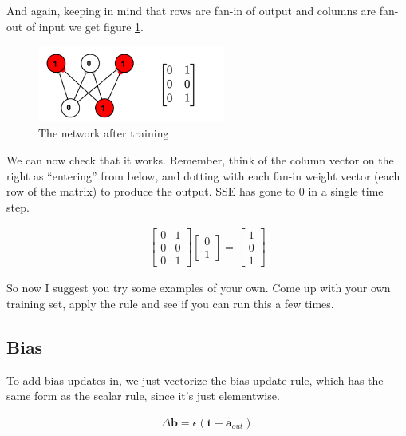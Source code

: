 And again, keeping in mind that rows are fan-in of output and columns are fan-out of input we get figure \ref{lms_vector_2}.

\begin{figure}[h]
\centering
\includegraphics[width=0.55\textwidth]{images/vectorLMSAfterTrain.png}
\caption[Jeff Yoshimi.]{The network after training}
\label{lms_vector_2}
\end{figure}

We can now check that it works. Remember, think of the column vector on the right as ``entering'' from below, and dotting with each fan-in weight vector (each row of the matrix) to produce the output.  SSE has gone to 0 in a single time step.

\begin{align*}
\begin{bmatrix} 0 & 1 \\ 0 & 0 \\  0  & 1  \end{bmatrix}
\begin{bmatrix} 0 \\ 1 \end{bmatrix}
= \begin{bmatrix} 1 \\ 0 \\ 1  \end{bmatrix}
\end{align*}

So now I suggest you try some examples of your own.  Come up with your own training set, apply the rule and see if you can run this a few times.  

\subsection{Bias}

To add bias updates in, we just vectorize the bias update rule, which has the same form as the scalar rule, since it's just elementwise.

\begin{eqnarray*}
\Delta \mathbf{b}  =  \epsilon (\mathbf{t} - \mathbf{a}_{out})
\end{eqnarray*}

